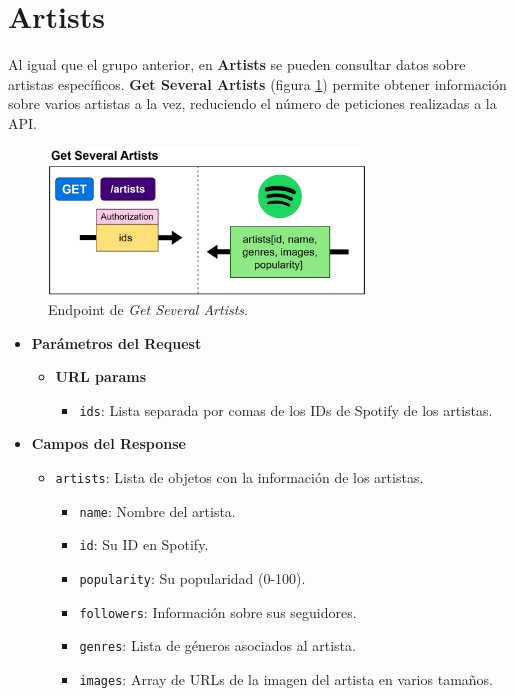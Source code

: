 \section*{Artists}

Al igual que el grupo anterior, en \textbf{Artists} se pueden consultar datos sobre artistas específicos. \textbf{Get Several Artists} (figura \ref{fig:get_several_artists}) permite obtener información sobre varios artistas a la vez, reduciendo el número de peticiones realizadas a la API.

\begin{figure}[H]
    \centering
    \includegraphics[width=0.75\textwidth]{figures/endpoints/get_several_artists.png}
    \caption{Endpoint de \textit{Get Several Artists}.}
    \label{fig:get_several_artists}
\end{figure}

\begin{itemize}
    \item \textbf{Parámetros del Request}
          \begin{itemize}
              \item \textbf{URL params}
                    \begin{itemize}
                        \item \texttt{ids}: Lista separada por comas de los IDs de Spotify de los artistas.
                    \end{itemize}
          \end{itemize}
    \item \textbf{Campos del Response}
          \begin{itemize}
              \item \texttt{artists}: Lista de objetos con la información de los artistas.
                    \begin{itemize}
                        \item \texttt{name}: Nombre del artista.
                        \item \texttt{id}: Su ID en Spotify.
                        \item \texttt{popularity}: Su popularidad (0-100).
                        \item \texttt{followers}: Información sobre sus seguidores.
                        \item \texttt{genres}: Lista de géneros asociados al artista.
                        \item \texttt{images}: Array de URLs de la imagen del artista en varios tamaños.
                    \end{itemize}
          \end{itemize}
\end{itemize}




